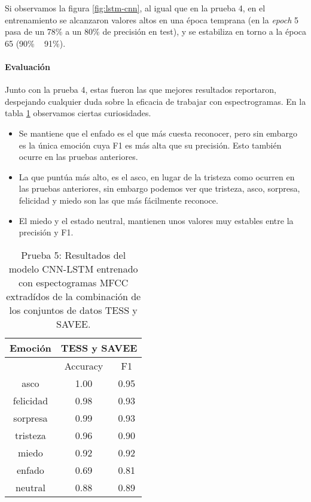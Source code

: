 \documentclass[11pt,a4paper,spanish]{book}
\begin{document}
	Si observamos la figura \ref{fig:lstm-cnn}, al igual que en la prueba 4, en el entrenamiento se alcanzaron valores altos en una época temprana (en la \emph{epoch} 5  pasa de un 78\% a un 80\% de precisión en test), y se estabiliza en torno a la época 65 (90\% ~ 91\%).

	\paragraph{Evaluación}
	Junto con la prueba 4, estas fueron las que mejores resultados reportaron, despejando cualquier duda sobre la eficacia de trabajar con espectrogramas. En la tabla \ref{result_Test5} observamos ciertas curiosidades.
	\begin{itemize}
		\item Se mantiene que el enfado es el que más cuesta reconocer, pero sin embargo es la única emoción cuya F1 es más alta que su precisión. Esto también ocurre en las pruebas anteriores.
		
		\item La que puntúa más alto, es el asco, en lugar de la tristeza como ocurren en las pruebas anteriores, sin embargo podemos ver que tristeza, asco, sorpresa, felicidad y miedo son las que más fácilmente reconoce. 
		
		\item El miedo y el estado neutral, mantienen unos valores muy estables entre la precisión y F1.
	\end{itemize}
	
	\begin{table}[H]
		\centering
		\begin{center}
			\begin{tabular}{| c|| c c | }
				\hline
				\multicolumn{1}{|c||}{Emoción} & 
				\multicolumn{2}{|c|}{TESS y SAVEE} \\
				\hline
				& 
				\multicolumn{1}{|c|}{Accuracy}&\multicolumn{1}{|c|}{F1}\\
				\hline
				asco 		& 1.00 & 0.95 \\
				felicidad 	& 0.98 & 0.93 \\
				sorpresa 	& 0.99 & 0.93 \\
				tristeza 	& 0.96 & 0.90 \\
				miedo 		& 0.92 & 0.92\\
				enfado 		& 0.69  & 0.81 \\
				neutral 	& 0.88 & 0.89\\
				\hline
			\end{tabular}
			
			\caption{Prueba 5: Resultados del modelo CNN-LSTM entrenado con espectogramas MFCC extradídos de la combinación de los conjuntos de datos TESS y SAVEE.}
			\label{result_Test5}
		\end{center}
	\end{table}
	
\end{document}
